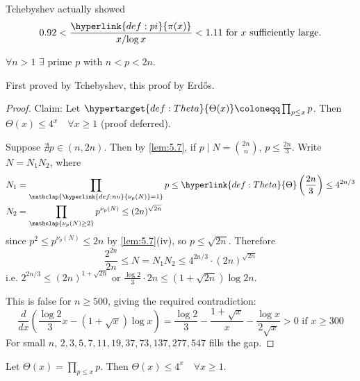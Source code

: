 \documentclass{article}
\begin{document}
Tchebyshev actually showed
\begin{equation*}
    0.92 < \frac{\hyperlink{def:pi}{\pi(x)}}{{x}/{\log x}} < 1.11 \text{ for $x$ sufficiently large.}
\end{equation*}

\begin{nthm}\label{thm:5.9}
    $\forall n > 1$ $\exists$ prime $p$ with $n < p < 2n$.
\end{nthm}

First proved by Tchebyshev, this proof by Erd\H{o}s.
\begin{proof}
    Claim: Let $\hypertarget{def:Theta}{\Theta(x)} \coloneqq \prod_{p \leq x} p$.
    Then $\Theta(x) \leq 4^x \quad \forall x \geq 1$ (proof deferred).

    Suppose $\nexists p \in (n, 2n)$. Then by \cref{lem:5.7}, if $p \mid N = \binom{2n}{n}$, $p \leq \frac{2n}{3}$.
    Write $N = N_1 N_2$, where
    \begin{align*}
        N_1 &= \prod_{\mathclap{\hyperlink{def:nu}{\nu_p(N)} = 1}} p \leq \hyperlink{def:Theta}{\Theta}\left(\frac{2n}{3}\right) \leq 4^{2n/3} \\
        N_2 &= \prod_{\mathclap{\nu_p(N) \geq 2}} p^{\nu_p(N)} \leq (2n)^{\sqrt{2n}}
    \end{align*}
    since  $p^2 \leq p^{\nu_p(N)} \leq 2n$  by \cref{lem:5.7}(iv), so $p \leq \sqrt{2n}$.
    Therefore
    \begin{equation*}
        \frac{2^{2n}}{2n} \leq N = N_1 N_2 \leq 4^{2n/3} \cdot (2n)^{\sqrt{2n}}
    \end{equation*}
    i.e. $2^{2n/3} \leq (2n)^{1 + \sqrt{2n}}$ or $\frac{\log 2}{3} \cdot 2n \leq (1 + \sqrt{2n}) \log 2n$.

    This is false for $n \geq 500$, giving the required contradiction:
    \begin{equation*}
        \frac{d}{dx} \left(\frac{\log 2}{3} x - (1 + \sqrt{x}) \log x\right) = \frac{\log 2}{3} - \frac{1+\sqrt{x}}{x} - \frac{\log x}{2 \sqrt{x}} > 0 \text{ if } x \geq 300
    \end{equation*}
    For small $n$, $2,3,5,7,11,19,37,73,137,277,547$ fills the gap.
\end{proof}

\begin{prop}
    Let $\Theta(x) = \prod_{p \leq x} p$. Then $\Theta(x) \leq 4^x \quad \forall x \geq 1$.
\end{prop}
\end{document}
